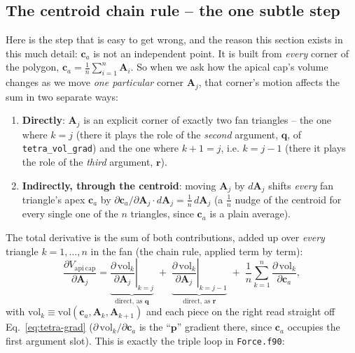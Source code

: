 \documentclass[11pt,a4paper]{report}
\newcommand{\rvec}{\mathbf{r}}
\newcommand{\pvec}{\mathbf{p}}
\newcommand{\qvec}{\mathbf{q}}
\newcommand{\Aarr}{\mathbf{A}}
\newcommand{\ca}{\mathbf{c}_a}
\begin{document}
\subsection{The centroid chain rule -- the one subtle step}
\label{sec:centroid-chain}
Here is the step that is easy to get wrong, and the reason this
section exists in this much detail: $\ca$ is not an independent point.
It is built from \emph{every} corner of the polygon,
$\ca = \tfrac1n\sum_{i=1}^n \Aarr_i$. So when we ask how the apical
cap's volume changes as we move \emph{one particular} corner
$\Aarr_j$, that corner's motion affects the sum in two separate ways:
\begin{enumerate}
  \item \textbf{Directly}: $\Aarr_j$ is an explicit corner of exactly
  two fan triangles -- the one where $k=j$ (there it plays the role of
  the \emph{second} argument, $\qvec$, of \texttt{tetra\_vol\_grad}) and
  the one where $k{+}1=j$, i.e. $k=j-1$ (there it plays the role of the
  \emph{third} argument, $\rvec$).
  \item \textbf{Indirectly, through the centroid}: moving $\Aarr_j$ by
  $d\Aarr_j$ shifts \emph{every} fan triangle's apex $\ca$ by
  $\partial \ca/\partial \Aarr_j \cdot d\Aarr_j = \tfrac1n\, d\Aarr_j$
  (a $\tfrac1n$ nudge of the centroid for every single one of the $n$
  triangles, since $\ca$ is a plain average).
\end{enumerate}
The total derivative is the sum of both contributions, added up over
\emph{every} triangle $k=1,\dots,n$ in the fan (the chain rule, applied
term by term):
\begin{equation}
  \frac{\partial V_{\mathrm{api\ cap}}}{\partial \Aarr_j}
  = \underbrace{\left.\frac{\partial\, \mathrm{vol}_k}{\partial \Aarr_j}\right|_{k=j} }_{\text{direct, as } \qvec}
  \;+\;
  \underbrace{\left.\frac{\partial\, \mathrm{vol}_k}{\partial \Aarr_j}\right|_{k=j-1}}_{\text{direct, as } \rvec}
  \;+\;
  \frac{1}{n}\sum_{k=1}^{n} \frac{\partial\, \mathrm{vol}_k}{\partial \ca} ,
  \label{eq:chain-rule}
\end{equation}
with $\mathrm{vol}_k \equiv \mathrm{vol}(\ca,\Aarr_k,\Aarr_{k+1})$ and each
piece on the right read straight off Eq.~\ref{eq:tetra-grad}
($\partial\,\mathrm{vol}_k/\partial\ca$ is the ``$\pvec$'' gradient there,
since $\ca$ occupies the first argument slot). This is exactly the
triple loop in \texttt{Force.f90}:
\end{document}
